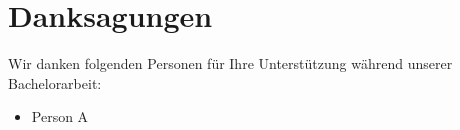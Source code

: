 \cleardoublepage

\section*{Danksagungen}

Wir danken folgenden Personen für Ihre Unterstützung während unserer Bachelorarbeit:

\begin{itemize}
	\item Person A
\end{itemize}
